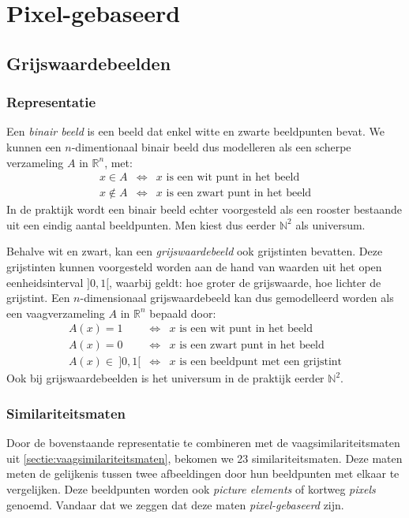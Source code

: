 \section{Pixel-gebaseerd}

\subsection{Grijswaardebeelden}

\subsubsection{Representatie}

Een \emph{binair beeld} is een beeld dat enkel witte en zwarte beeldpunten bevat. We kunnen een 
$n$-dimentionaal binair beeld dus modelleren als een scherpe verzameling $A$ in $\mathbb{R}^n$, met:
$$
\begin{array}{rcl}
x \in A & \iff & x \textrm{ is een wit punt in het beeld} \\
x \notin A & \iff & x \textrm{ is een zwart punt in het beeld}
\end{array}
$$ 
In de praktijk wordt een binair beeld echter voorgesteld als een rooster bestaande uit een
eindig aantal beeldpunten. Men kiest dus eerder $\mathbb{N}^2$ als universum.

Behalve wit en zwart, kan een \emph{grijswaardebeeld} ook grijstinten bevatten. Deze grijstinten
kunnen voorgesteld worden aan de hand van waarden uit het open eenheidsinterval $]0,1[$, waarbij
geldt: hoe groter de grijswaarde, hoe lichter de grijstint. Een $n$-dimensionaal grijswaardebeeld
kan dus gemodelleerd worden als een vaagverzameling $A$ in $\mathbb{R}^n$ bepaald door:
$$
\begin{array}{rcl}
A(x) = 1 & \iff & x \textrm{ is een wit punt in het beeld} \\
A(x) = 0 & \iff & x \textrm{ is een zwart punt in het beeld} \\
A(x) \in\ ]0,1[ & \iff & x \textrm{ is een beeldpunt met een grijstint}
\end{array}
$$
Ook bij grijswaardebeelden is het universum in de praktijk eerder $\mathbb{N}^2$.

\subsubsection{Similariteitsmaten}

Door de bovenstaande representatie te combineren met de vaagsimilariteitsmaten uit 
\ref{sectie:vaagsimilariteitsmaten}, bekomen we 23 similariteitsmaten. Deze maten
meten de gelijkenis tussen twee afbeeldingen door hun beeldpunten met elkaar te vergelijken.
Deze beeldpunten worden ook \emph{picture elements} of kortweg \emph{pixels} genoemd. Vandaar
dat we zeggen dat deze maten \emph{pixel-gebaseerd} zijn.

